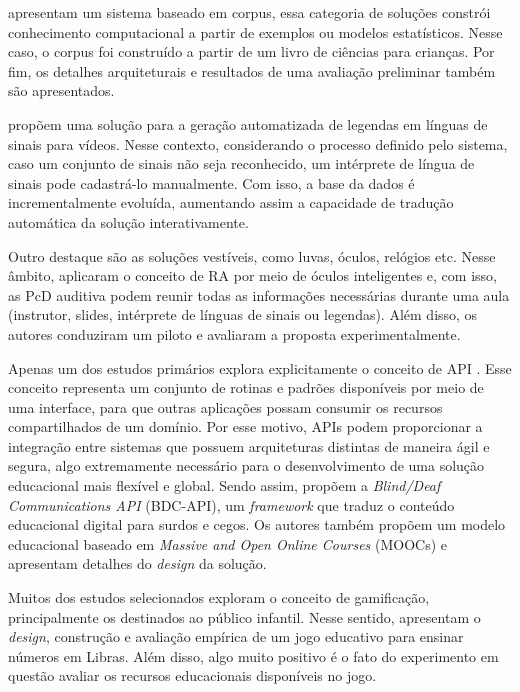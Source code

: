  apresentam um sistema baseado em corpus, essa categoria de soluções constrói conhecimento computacional a partir de exemplos ou modelos estatísticos. Nesse caso, o corpus foi construído a partir de um livro de ciências para crianças. Por fim, os detalhes arquiteturais e resultados de uma avaliação preliminar também são apresentados.

 propõem uma solução para a geração automatizada de legendas em línguas de sinais para vídeos. Nesse contexto, considerando o processo definido pelo sistema, caso um conjunto de sinais não seja reconhecido, um intérprete de língua de sinais pode cadastrá-lo manualmente. Com isso, a base da dados é incrementalmente evoluída, aumentando assim a capacidade de tradução automática da solução interativamente.

Outro destaque são as soluções vestíveis, como luvas, óculos, relógios etc. Nesse âmbito,  aplicaram o conceito de RA por meio de óculos inteligentes e, com isso, as PcD auditiva podem reunir todas as informações necessárias durante uma aula (instrutor, slides, intérprete de línguas de sinais ou legendas). Além disso, os autores conduziram um piloto e avaliaram a proposta experimentalmente.

Apenas um dos estudos primários explora explicitamente o conceito de API \cite{INT56}. Esse conceito representa um conjunto de rotinas e padrões disponíveis por meio de uma interface, para que outras aplicações possam consumir os recursos compartilhados de um domínio. Por esse motivo, APIs podem proporcionar a integração entre sistemas que possuem arquiteturas distintas de maneira ágil e segura, algo extremamente necessário para o desenvolvimento de uma solução educacional mais flexível e global. Sendo assim,  propõem a \textit{Blind/Deaf Communications API} (BDC-API), um \textit{framework} que traduz o conteúdo educacional digital para surdos e cegos. Os autores também propõem um modelo educacional baseado em \textit{Massive and Open Online Courses} (MOOCs) e apresentam detalhes do \textit{design} da solução.

Muitos dos estudos selecionados exploram o conceito de gamificação, principalmente os destinados ao público infantil. Nesse sentido,  apresentam o \textit{design}, construção e avaliação empírica de um jogo educativo para ensinar números em Libras. Além disso, algo muito positivo é o fato do experimento em questão avaliar os recursos educacionais disponíveis no jogo.

